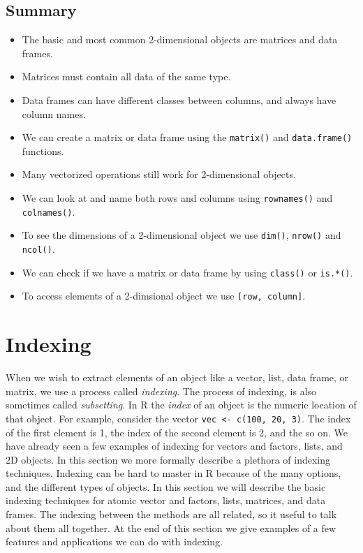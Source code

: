 \documentclass[
]{book}
\begin{document}
\hypertarget{summary-2}{%
\section*{Summary}\label{summary-2}}

\begin{itemize}
\item
  The basic and most common 2-dimensional objects are matrices and data frames.
\item
  Matrices must contain all data of the same type.
\item
  Data frames can have different classes between columns, and always have column names.
\item
  We can create a matrix or data frame using the \texttt{matrix()} and \texttt{data.frame()} functions.
\item
  Many vectorized operations still work for 2-dimensional objects.
\item
  We can look at and name both rows and columns using \texttt{rownames()} and \texttt{colnames()}.
\item
  To see the dimensions of a 2-dimensional object we use \texttt{dim()}, \texttt{nrow()} and \texttt{ncol()}.
\item
  We can check if we have a matrix or data frame by using \texttt{class()} or \texttt{is.*()}.
\item
  To access elements of a 2-dimsional object we use \texttt{{[}row,\ column{]}}.
\end{itemize}

\hypertarget{indexing}{%
\chapter{Indexing}\label{indexing}}

When we wish to extract elements of an object like a vector, list, data frame, or matrix, we use a process called \emph{indexing}. The process of indexing, is also sometimes called \emph{subsetting}. In R the \emph{index} of an object is the numeric location of that object. For example, consider the vector \texttt{vec\ \textless{}-\ c(100,\ 20,\ 3)}. The index of the first element is 1, the index of the second element is 2, and the so on. We have already seen a few examples of indexing for vectors and factors, lists, and 2D objects. In this section we more formally describe a plethora of indexing techniques. Indexing can be hard to master in R because of the many options, and the different types of objects. In this section we will describe the basic indexing techniques for atomic vector and factors, lists, matrices, and data frames. The indexing between the methods are all related, so it useful to talk about them all together. At the end of this section we give examples of a few features and applications we can do with indexing.
\end{document}
